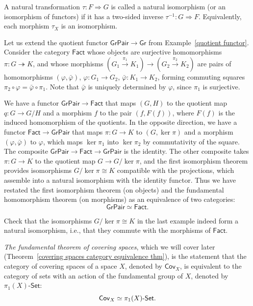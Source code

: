 %
\begin{defn}
    A natural transformation $\tau:F\Longrightarrow G$ is called a natural isomorphism (or an isomorphism of functors) if it has a two-sided inverse $\tau^{-1}:G\Longrightarrow F$. Equivalently, each morphism $\tau_X$ is an isomorphism.
\end{defn}
%
\begin{example}
    Let us extend the quotient functor $\mathsf{GrPair}\to\mathsf{Gr}$
    from Example~\ref{quotient functor}. Consider the category $\mathsf{Fact}$ whose objects are
    surjective homomorphisms $\pi:G\twoheadrightarrow K$, and whose morphisms
    $(G_{1}\overset{\pi_{1}}{\to}K_{1})\to(G_{2}\overset{\pi_{2}}{\to}K_{2})$ are pairs of
    homomorphisms $(\varphi,\bar\varphi)$, $\varphi:G_{1}\to G_{2}$, $\bar\varphi:K_{1}\to K_{2}$,
    forming commuting squares $\pi_{2}\circ\varphi=\bar\varphi\circ\pi_{1}$. Note that $\bar\varphi$ is
    uniquely determined by $\varphi$, since $\pi_{1}$ is surjective.

    We have a functor $\mathsf{GrPair}\to\mathsf{Fact}$ that maps $\left(G,H\right)$ to the quotient map
    $q:G\to G/H$ and a morphism $f$ to the pair $(f,F(f))$, where $F(f)$ is the induced
    homomorphism of the quotients. In the opposite direction, we have a functor
    $\mathsf{Fact}\to\mathsf{GrPair}$ that maps $\pi:G\to K$ to $\left(G,\ker\pi\right)$
    and a morphism $(\varphi,\bar\varphi)$ to $\varphi$, which maps $\ker\pi_{1}$ into $\ker\pi_{2}$
    by commutativity of the square. The composite $\mathsf{GrPair}\to\mathsf{Fact}\to\mathsf{GrPair}$
    is the identity. The other composite takes $\pi:G\to K$ to the quotient map $G\to G/\ker\pi$,
    and the first isomorphism theorem provides isomorphisms $G/\ker\pi\cong K$ compatible with the projections,
    which assemble into a natural isomorphism with the identity functor. Thus we have
    restated the first isomorphism theorem (on objects) and the fundamental homomorphism theorem (on morphisms) as an equivalence of two categories:
    \[
    \mathsf{GrPair}\simeq\mathsf{Fact}.
    \]
\end{example}
\begin{xca}
    Check that the isomorphisms $G/\ker\pi\cong K$ in the last example indeed form a natural isomorphism, i.e., that they commute with the morphisms of $\mathsf{Fact}$.
\end{xca}
\begin{example}\label{covering category thm}
    \emph{The fundamental theorem of covering spaces},
    which we will cover later (Theorem~\ref{covering spaces category equivalence thm}), is the statement that the category of covering
    spaces of a space $X$, denoted by $\mathsf{Cov}_{X}$, is equivalent
    to the category of sets with an action of the fundamental group of
    $X$, denoted by $\pi_{1}\left(X\right)\text{-}\mathsf{Set}$:
    \[
    \mathsf{Cov}_{X}\simeq \pi_{1}(X){\text -}\mathsf{Set}.
    \]
\end{example}
